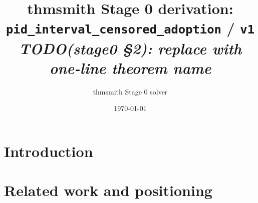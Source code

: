 \documentclass[11pt]{article}
\title{thmsmith Stage 0 derivation: \texttt{pid\_interval\_censored\_adoption} / \texttt{v1}%
  \\ \large\textit{TODO(stage0 \S2): replace with one-line theorem name}}
\author{thmsmith Stage 0 solver}
\date{\today}
\theoremstyle{definition}
\theoremstyle{plain}
\theoremstyle{remark}
\begin{document}
\maketitle


\begin{abstract}
\end{abstract}

\section{Introduction}

\section{Related work and positioning}
\end{document}
